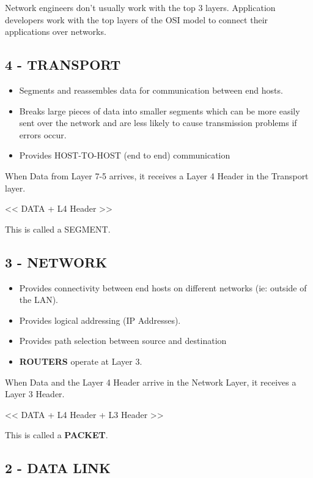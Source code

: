 Network engineers don't usually work with the top 3 layers. Application
developers work with the top layers of the OSI model to connect their
applications over networks.

\subsection{4 - TRANSPORT}\label{transport}

\begin{itemize}
\tightlist
\item
  Segments and reassembles data for communication between end hosts.
\item
  Breaks large pieces of data into smaller segments which can be more
  easily sent over the network and are less likely to cause transmission
  problems if errors occur.
\item
  Provides HOST-TO-HOST (end to end) communication
\end{itemize}

When Data from Layer 7-5 arrives, it receives a Layer 4 Header in the
Transport layer.

\textless\textless{} DATA + L4 Header \textgreater\textgreater{}

This is called a SEGMENT.

\subsection{3 - NETWORK}\label{network}

\begin{itemize}
\tightlist
\item
  Provides connectivity between end hosts on different networks (ie:
  outside of the LAN).
\item
  Provides logical addressing (IP Addresses).
\item
  Provides path selection between source and destination
\item
  \textbf{ROUTERS} operate at Layer 3.
\end{itemize}

When Data and the Layer 4 Header arrive in the Network Layer, it
receives a Layer 3 Header.

\textless\textless{} DATA + L4 Header + L3 Header
\textgreater\textgreater{}

This is called a \textbf{PACKET}.

\subsection{2 - DATA LINK}\label{data-link}

